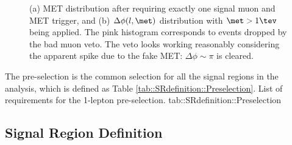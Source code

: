 \begin{figure}[h]
  \centering
    \caption{(a) MET distribution after requiring exactly one signal muon and MET trigger, and (b) $\Delta \phi (l,\met)$ distribution with $\met>1\tev$ being applied. The pink histogram corresponds to events dropped by the bad muon veto. The veto looks working reasonably considering the apparent spike due to the fake MET: $\Delta \phi \sim \pi$ is cleared.}
    \label{fig::SRdefinition::badMuonVeto}
\end{figure}

The pre-selection is the common selection for all the signal regions in the analysis, which is defined as Table \ref{tab::SRdefinition::Preselection}.
{List of requirements for the 1-lepton pre-selection.}
{tab::SRdefinition::Preselection}

\subsection{Signal Region Definition}
